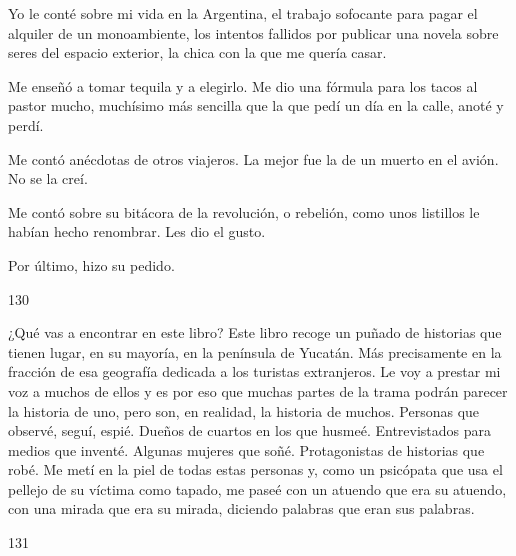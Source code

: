 \documentclass[12pt,twoside,openright,a5paper]{book}
\begin{document}
Yo le conté sobre mi vida en la Argentina, el trabajo sofocante para pagar el
alquiler de un monoambiente, los intentos fallidos por publicar una novela
sobre seres del espacio exterior, la chica con la que me quería casar.

Me enseñó a tomar tequila y a elegirlo. Me dio una fórmula para los
tacos al pastor mucho, muchísimo más sencilla que la que pedí un día
en la calle, anoté y perdí.

Me contó anécdotas de otros viajeros. La mejor fue la de un muerto en el
avión. No se la creí.

Me contó sobre su bitácora de la revolución, o rebelión, como unos
listillos le habían hecho renombrar. Les dio el gusto.

Por último, hizo su pedido.

\vspace{0.5cm}
\afterpage{}
\hrulefill \hspace{0.1cm}\decofourleft\hspace{0.2cm} 130 \hspace{0.2cm}\decofourright \hspace{0.1cm}\hrulefill

\nopagebreak

\vspace{0.5cm}

\nopagebreak

¿Qué vas a encontrar en este libro? Este libro recoge un puñado
de historias que tienen lugar, en su mayoría, en la península de
Yucatán. Más precisamente en la fracción de esa geografía dedicada a
los turistas extranjeros. Le voy a prestar mi voz a muchos de ellos y es
por eso que muchas partes de la trama podrán parecer la historia de uno,
pero son, en realidad, la historia de muchos. Personas que observé, seguí,
espié. Dueños de cuartos en los que husmeé. Entrevistados para medios
que inventé. Algunas mujeres que soñé. Protagonistas de historias que
robé. Me metí en la piel de todas estas personas y, como un psicópata
que usa el pellejo de su víctima como tapado, me paseé con un atuendo
que era su atuendo, con una mirada que era su mirada, diciendo palabras
que eran sus palabras.


\vspace{0.5cm}

\hrulefill \hspace{0.1cm}\decofourleft\hspace{0.2cm} 131 \hspace{0.2cm}\decofourright \hspace{0.1cm}\hrulefill
\end{document}
